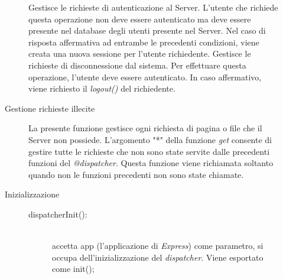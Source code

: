\begin{description}
\begin{description}
\begin{mldescription}
 Gestisce le richieste di autenticazione al Server. L'utente che richiede questa operazione non deve essere autenticato ma deve essere presente nel database degli utenti presente nel Server. Nel caso di risposta affermativa ad entrambe le precedenti condizioni, viene creata una nuova sessione per l'utente richiedente.
 Gestisce le richieste di disconnessione dal sistema. Per effettuare questa operazione, l'utente deve essere autenticato. In caso affermativo, viene richiesto il \textit{logout()} del richiedente.
 \end{mldescription}

\item[Gestione richieste illecite]
 \begin{mldescription}
 La presente funzione gestisce ogni richiesta di pagina o file che il Server non possiede. L'argomento "*" della funzione \textit{get} consente di gestire tutte le richieste che non sono state servite dalle precedenti funzioni del \textit{@dispatcher}. Questa funzione viene richiamata soltanto quando non le funzioni precedenti non sono state chiamate.
 \end{mldescription}

\item[Inizializzazione] \hfill
 \begin{description}
  \item[dispatcherInit():] \hfill \\ 
  accetta app (l'applicazione di \textit{Express}) come parametro, si occupa dell'inizializzazione del \textit{dispatcher}. Viene esportato come init();
 \end{description}
\end{description}
\end{description}



